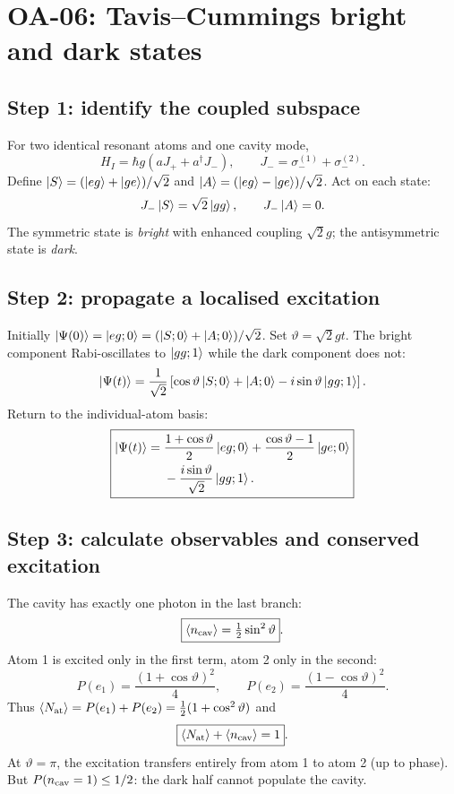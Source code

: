
\section{OA-06: Tavis--Cummings bright and dark states}
\subsection*{Step 1: identify the coupled subspace}
For two identical resonant atoms and one cavity mode,
\[
H_I=\hbar g(aJ_++a^\dagger J_-),\qquad
J_-=\sigma_-^{(1)}+\sigma_-^{(2)}.
\]
Define
\(\left\lvert S\right\rangle=(\left\lvert eg\right\rangle+\left\lvert ge\right\rangle)/\sqrt2\) and
\(\left\lvert A\right\rangle=(\left\lvert eg\right\rangle-\left\lvert ge\right\rangle)/\sqrt2\).
Act on each state:
\[
J_-\left\lvert S\right\rangle=\sqrt2\left\lvert gg\right\rangle,\qquad
J_-\left\lvert A\right\rangle=0.
\]
The symmetric state is \emph{bright} with enhanced coupling
\(\sqrt2g\); the antisymmetric state is \emph{dark}.

\subsection*{Step 2: propagate a localised excitation}
Initially \(\left\lvert \Psi(0)\right\rangle=\left\lvert eg;0\right\rangle
=(\left\lvert S;0\right\rangle+\left\lvert A;0\right\rangle)/\sqrt2\).
Set \(\vartheta=\sqrt2gt\). The bright component
Rabi-oscillates to \(\left\lvert gg;1\right\rangle\) while the dark
component does not:
\[
\left\lvert \Psi(t)\right\rangle=\frac1{\sqrt2}\left[
\cos\vartheta\left\lvert S;0\right\rangle+\left\lvert A;0\right\rangle
-i\sin\vartheta\left\lvert gg;1\right\rangle\right].
\]
Return to the individual-atom basis:
\[
\boxed{\begin{aligned}
\left\lvert \Psi(t)\right\rangle={}&\frac{1+\cos\vartheta}{2}\left\lvert eg;0\right\rangle
+\frac{\cos\vartheta-1}{2}\left\lvert ge;0\right\rangle\\
&-\frac{i\sin\vartheta}{\sqrt2}\left\lvert gg;1\right\rangle.
\end{aligned}}
\]

\subsection*{Step 3: calculate observables and conserved excitation}
The cavity has exactly one photon in the last branch:
\[
\boxed{\langle n_{\rm cav}\rangle
=\tfrac12\sin^2\vartheta}.
\]
Atom 1 is excited only in the first term, atom 2
only in the second:
\[
P(e_1)=\frac{(1+\cos\vartheta)^2}{4},\qquad
P(e_2)=\frac{(1-\cos\vartheta)^2}{4}.
\]
Thus \(\langle N_{\rm at}\rangle
=P(e_1)+P(e_2)=\tfrac12(1+\cos^2\vartheta)\)
and
\[
\boxed{\langle N_{\rm at}\rangle+
\langle n_{\rm cav}\rangle=1}.
\]
At \(\vartheta=\pi\), the excitation transfers entirely
from atom 1 to atom 2 (up to phase). But
\(P(n_{\rm cav}=1)\le1/2\): the dark half
cannot populate the cavity.
